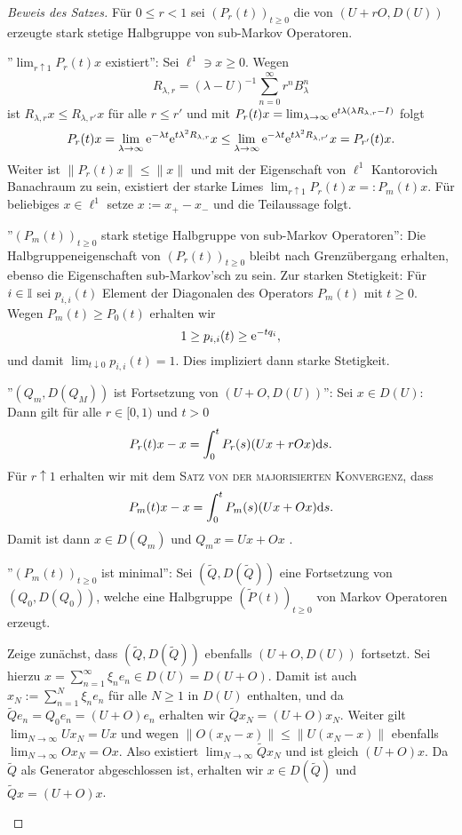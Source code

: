 \documentclass[a4paper]{paper}
\numberwithin{equation}{satz}
\begin{document}
\begin{proof}[Beweis des Satzes] Für $0\leq r< 1$ sei $(P_r(t))_{t\geq0}$ die von  $(U+rO, D(U))$ erzeugte stark stetige Halbgruppe von sub-Markov Operatoren.
  \begin{compactenum}
  \item ''$\lim_{r\uparrow 1}P_r(t)x$ existiert'': Sei $\ell^1\ni x\geq0$.  Wegen
    $$R_{\lambda, r}=(\lambda -U)^{-1}\sum_{n=0}^\infty r^n B_\lambda ^n$$
  ist $R_{\lambda,r}x\leq R_{\lambda, r'}x$ für alle $r\leq r'$ und mit $P_r(t)x=\lim_{\lambda\to\infty}\text e^{t\lambda(\lambda R_{\lambda,r}-I)}$ folgt 
    $$P_r(t)x=\lim_{\lambda\to\infty}\text e^{-\lambda t}\text e^{t\lambda^2 R_{\lambda, r}}x\leq\lim_{\lambda\to \infty}\text e^{-\lambda t}\text e^{t\lambda^2 R_{\lambda,r'}}x=P_{r'}(t)x.$$
  Weiter ist $\|P_r(t)x\|\leq\|x\|$   und mit der Eigenschaft von $\ell^1$ Kantorovich Banachraum zu sein,  existiert der starke Limes $\lim_{r\uparrow1}P_r(t)x=:P_m(t)x$. Für beliebiges $x\in\ell^1$ setze $x:=x_+ - x_-$ und die Teilaussage folgt.
  \item ''$(P_m(t))_{t\geq0}$ stark stetige Halbgruppe von sub-Markov Operatoren'':  Die Halbgruppeneigenschaft von $(P_r(t))_{t\geq0}$ bleibt nach Grenzübergang erhalten, ebenso die Eigenschaften sub-Markov'sch zu sein. Zur starken Stetigkeit: Für $i\in \mathbb{I}$ sei $p_{i,i}(t)$ Element der Diagonalen des Operators $P_m(t)$ mit $t\geq0$. Wegen $P_m(t)\geq P_0(t)$ erhalten wir $$1\geq p_{i,i}(t)\geq \text e^{-tq_i},$$ und  damit $\lim_{t\downarrow 0}p_{i,i}(t)=1$. Dies impliziert dann starke Stetigkeit.
  \item ''$(Q_m, D(Q_M))$ ist Fortsetzung von $(U+O, D(U))$'': Sei $x\in D(U)$: Dann gilt für alle $r\in[0,1)$ und $t>0$ $$P_r(t)x-x=\int_0^t P_r(s)(Ux+rOx)\text ds.$$
  Für $r\uparrow 1$ erhalten wir mit dem \textsc{Satz von der majorisierten Konvergenz}, dass
    $$P_m(t)x-x=\int_0^t P_m(s)(Ux+Ox)\text ds.$$
  Damit ist dann $x\in D(Q_m)$ und $Q_mx=Ux+Ox$ .
  \item ''$(P_m(t))_{t\geq0}$ ist minimal'': Sei $(\tilde Q, D(\tilde Q))$ eine  Fortsetzung von $(Q_0, D(Q_0))$, welche eine Halbgruppe $(\tilde P(t))_{t\geq0}$ von Markov Operatoren erzeugt. \\ 
  \par Zeige zunächst, dass $(\tilde Q, D(\tilde Q))$ ebenfalls $(U+O, D(U))$ fortsetzt. Sei hierzu $x=\sum_{n=1}^\infty \xi_n e_n \in D(U)=D(U+O)$. Damit ist auch $x_N:=\sum_{n=1}^N \xi_n e_n$ für alle $N\geq1$ in $D(U)$ enthalten, und da $\tilde Q e_n=Q_0e_n=(U+O)e_n$ erhalten wir $\tilde Q x_N=(U+O)x_N$. Weiter gilt $\lim_{N\to\infty}Ux_N =Ux$ und wegen $\|O(x_N-x)\|\leq \|U(x_N-x)\|$ ebenfalls $\lim_{N\to\infty}O x_N=Ox$. Also existiert $\lim_{N\to\infty}\tilde Q x_N$ und ist gleich $(U+O)x$. Da $\tilde Q$ als Generator abgeschlossen ist, erhalten wir $x\in D(\tilde Q)$ und $\tilde Qx=(U+O)x$.\\

\end{compactenum}
\end{proof}
\end{document}
